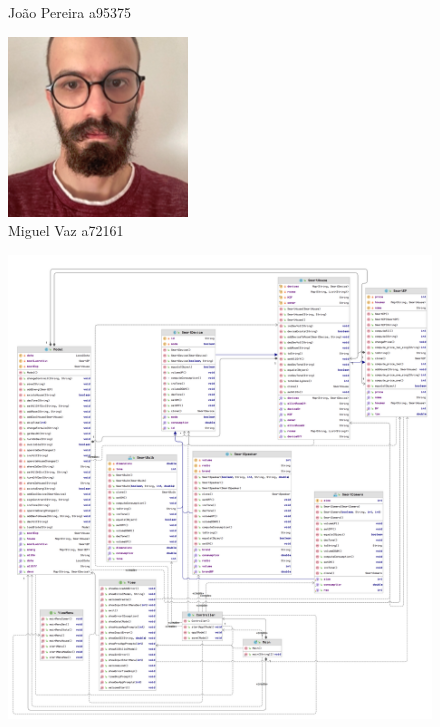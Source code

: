 \documentclass[10pt, a4paper]{article}
\begin{document}
\begin{figure}[!htb]
\begin{minipage}{0.33\textwidth}
        \caption{João Pereira a95375}
\end{minipage}\hfill
\begin{minipage}{0.30\textwidth}
        \centering
        \includegraphics[width=\linewidth]{Miguel.png}
        \caption{Miguel Vaz a72161}
\end{minipage}
\end{figure}
\newpage
\tableofcontents
\begin{figure}
        \centering
        \includegraphics[width=\textwidth]{diagram_1.png}
\end{figure}
\newpage
\end{document}

